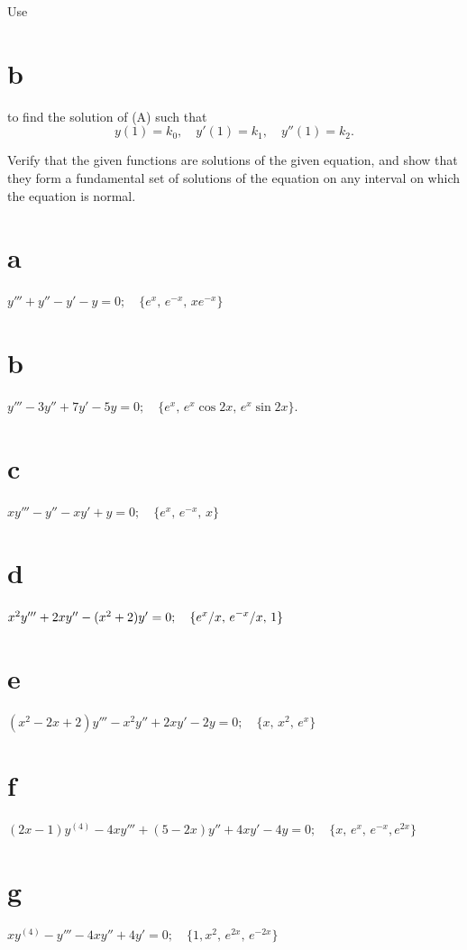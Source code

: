 \begin{exerciselist}
\begin{alist}
    \item %
    Use \part{b} to find the solution of (A) such that
    \[
      y(1)=k_{0},\quad y'(1)=k_{1},\quad y''(1)=k_{2}.
    \]
  \end{alist}

  \item\label{exer:9.1.6} Verify that the given functions are solutions of the given equation, and
        show that they form a fundamental set of solutions of the equation on any interval on which
        the equation is normal.

\part{a} $y'''+y''-y'-y=0;\quad\{e^{x},\,e^{-x},\,xe^{-x}\}$

\part{b} $y'''-3y''+7y'-5y=0;\quad\{e^{x},\,e^{x}\cos2x,\,e^{x}\sin2x\}$.

\part{c} $xy'''-y''-xy'+y=0;\quad\{e^{x},\,e^{-x},\,x\}$

\part{d} $x^{2}y'''+2xy''-(x^{2}+2)y'=0;\quad\displaystyle\{e^{x}/x,\,e^{-x}/ x,\,1\}$

\part{e} $(x^{2}-2x+2)y'''-x^{2}y''+2xy'-2y=0;\quad\{x,\,x^{2},\,e^{x}\}$

\part{f} $(2x-1)y^{(4)}-4xy'''+(5-2x)y''+4xy'-4y=0; \quad\{x,\,e^{x},\,e^{-x},e^{2x}\}$

\part{g} $xy^{(4)}-y'''-4xy''+4y'=0;\quad\{1,x^{2},\,e^{2x},\,e^{-2x}\}$


\end{exerciselist}
